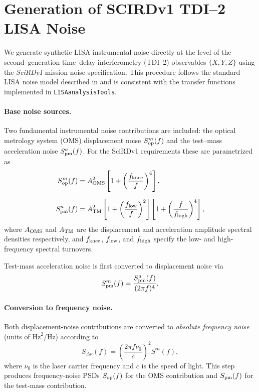\section{Generation of SCIRDv1 TDI--2 LISA Noise}
\label{subsec:lisa_noise_generation}

We generate synthetic LISA instrumental noise directly at the level of the 
second--generation time–delay interferometry (TDI--2) observables 
$\{X,Y,Z\}$ using the \emph{SciRDv1} mission noise specification.
This procedure follows the standard LISA noise model described in
\citet{Prince2002, Tinto2014, Nam2023} and is consistent with the 
transfer functions implemented in \texttt{LISAanalysisTools}.

\paragraph{Base noise sources.}
Two fundamental instrumental noise contributions are included:
the optical metrology system (OMS) displacement noise
$S^{m}_{\rm op}(f)$ and the test--mass acceleration noise $S^{a}_{\rm pm}(f)$.
For the SciRDv1 requirements these are parametrized as
%
\begin{align}
S^{m}_{\rm op}(f)
&=
A_{\rm OMS}^2
\left[
1 + \left(\frac{f_{\rm knee}}{f}\right)^4
\right],
\\[6pt]
S^{a}_{\rm pm}(f)
&=
A_{\rm TM}^2
\left[
1 + \left(\frac{f_{\rm low}}{f}\right)^2
\right]
\left[
1 + \left(\frac{f}{f_{\rm high}}\right)^4
\right],
\end{align}
%
where $A_{\rm OMS}$ and $A_{\rm TM}$ are the displacement and 
acceleration amplitude spectral densities respectively, and
$f_{\rm knee}$, $f_{\rm low}$, and $f_{\rm high}$ specify the low-
and high-frequency spectral turnovers.

Test-mass acceleration noise is first converted to displacement noise via
\begin{equation}
S^{m}_{\rm pm}(f)
=
\frac{S^{a}_{\rm pm}(f)}{(2\pi f)^4}.
\end{equation}

\paragraph{Conversion to frequency noise.}
Both displacement-noise contributions are converted to
\emph{absolute frequency noise} (units of $\mathrm{Hz}^2/\mathrm{Hz}$)
according to
%
\begin{equation}
S_{\Delta\nu}(f)
=
\left( \frac{2\pi f \nu_0}{c} \right)^2
S^{m}(f),
\end{equation}
%
where $\nu_0$ is the laser carrier frequency and $c$ is the speed of light.
This step produces frequency-noise PSDs
$S_{\rm op}(f)$ for the OMS contribution and
$S_{\rm pm}(f)$ for the test-mass contribution.


